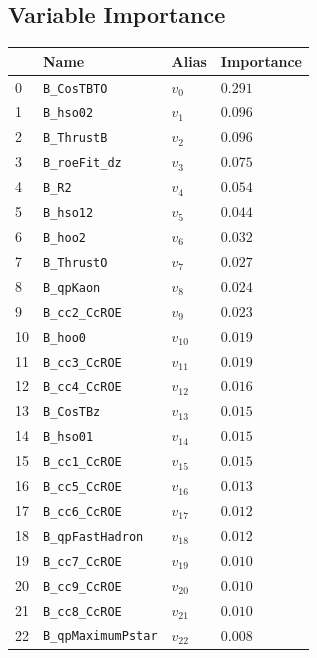 \subsection*{Variable Importance}

\begin{longtable}{| p{} | p{} | p{} |p{} |}
\hline
& Name & Alias & Importance \\ \hline
0 &\texttt{B\_CosTBTO} & $v_{0}$ & $0.291$ \\ \hline
1 &\texttt{B\_hso02} & $v_{1}$ & $0.096$ \\ \hline
2 &\texttt{B\_ThrustB} & $v_{2}$ & $0.096$ \\ \hline
3 &\texttt{B\_roeFit\_dz} & $v_{3}$ & $0.075$ \\ \hline
4 &\texttt{B\_R2} & $v_{4}$ & $0.054$ \\ \hline
5 &\texttt{B\_hso12} & $v_{5}$ & $0.044$ \\ \hline
6 &\texttt{B\_hoo2} & $v_{6}$ & $0.032$ \\ \hline
7 &\texttt{B\_ThrustO} & $v_{7}$ & $0.027$ \\ \hline
8 &\texttt{B\_qpKaon} & $v_{8}$ & $0.024$ \\ \hline
9 &\texttt{B\_cc2\_CcROE} & $v_{9}$ & $0.023$ \\ \hline
10 &\texttt{B\_hoo0} & $v_{10}$ & $0.019$ \\ \hline
11 &\texttt{B\_cc3\_CcROE} & $v_{11}$ & $0.019$ \\ \hline
12 &\texttt{B\_cc4\_CcROE} & $v_{12}$ & $0.016$ \\ \hline
13 &\texttt{B\_CosTBz} & $v_{13}$ & $0.015$ \\ \hline
14 &\texttt{B\_hso01} & $v_{14}$ & $0.015$ \\ \hline
15 &\texttt{B\_cc1\_CcROE} & $v_{15}$ & $0.015$ \\ \hline
16 &\texttt{B\_cc5\_CcROE} & $v_{16}$ & $0.013$ \\ \hline
17 &\texttt{B\_cc6\_CcROE} & $v_{17}$ & $0.012$ \\ \hline
18 &\texttt{B\_qpFastHadron} & $v_{18}$ & $0.012$ \\ \hline
19 &\texttt{B\_cc7\_CcROE} & $v_{19}$ & $0.010$ \\ \hline
20 &\texttt{B\_cc9\_CcROE} & $v_{20}$ & $0.010$ \\ \hline
21 &\texttt{B\_cc8\_CcROE} & $v_{21}$ & $0.010$ \\ \hline
22 &\texttt{B\_qpMaximumPstar} & $v_{22}$ & $0.008$ \\ \hline

\end{longtable}
